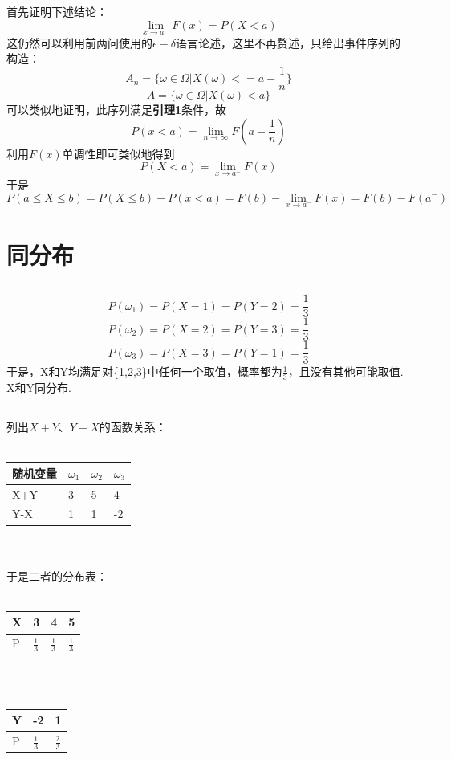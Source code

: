 \documentclass{article}
\begin{document}
\begin{CJK}{UTF8}{gbsn}
\subsection{}
首先证明下述结论：
$$\lim_{x\to a^{-}}F(x)=P(X<a)$$
这仍然可以利用前两问使用的$\epsilon-\delta$语言论述，这里不再赘述，只给出事件序列的构造：
$$A_{n}=\{\omega\in\Omega|X(\omega)<=a-\frac{1}{n}\}$$
$$A=\{\omega\in\Omega|X(\omega)<a\}$$
可以类似地证明，此序列满足\textbf{引理1}条件，故
$$P(x<a)=\lim_{n\to\infty}F(a-\frac{1}{n})$$
利用$F(x)$单调性即可类似地得到
$$P(X<a)=\lim_{x\to a^{-}}F(x)$$
于是
$$P(a\leq X\leq b)=P(X\leq b)-P(x<a)=F(b)-\lim_{x\to a^{-}}F(x)=F(b)-F(a^{-})$$
\section{同分布}
\subsection{}
$$ P(\omega_{1})=P(X=1)=P(Y=2)=\frac{1}{3} $$
$$ P(\omega_{2})=P(X=2)=P(Y=3)=\frac{1}{3} $$
$$ P(\omega_{3})=P(X=3)=P(Y=1)=\frac{1}{3} $$
于是，X和Y均满足对\{1,2,3\}中任何一个取值，概率都为$\frac{1}{3}$，且没有其他可能取值.
\\X和Y同分布.
\subsection{}
列出$X+Y$、$Y-X$的函数关系：
\\\\
\begin{tabular}{l|l|l|l}
	随机变量 & $\omega_{1}$ & $\omega_{2}$ & $\omega_{3}$\\
	\hline
	X+Y & 3 & 5 & 4\\
    \hline
	Y-X & 1 & 1 & -2\\
\end{tabular}
\\\\
于是二者的分布表：
\\\\
\begin{tabular}{l|l|l|l}
	X & 3 & 4 & 5\\
	\hline
	P & $\frac{1}{3}$ & $\frac{1}{3}$ & $\frac{1}{3}$\\
\end{tabular}
\\\\
\begin{tabular}{l|l|l}
	Y & -2 & 1\\
	\hline
	P & $\frac{1}{3}$ & $\frac{2}{3}$\\
\end{tabular}

\end{CJK}
\end{document}
